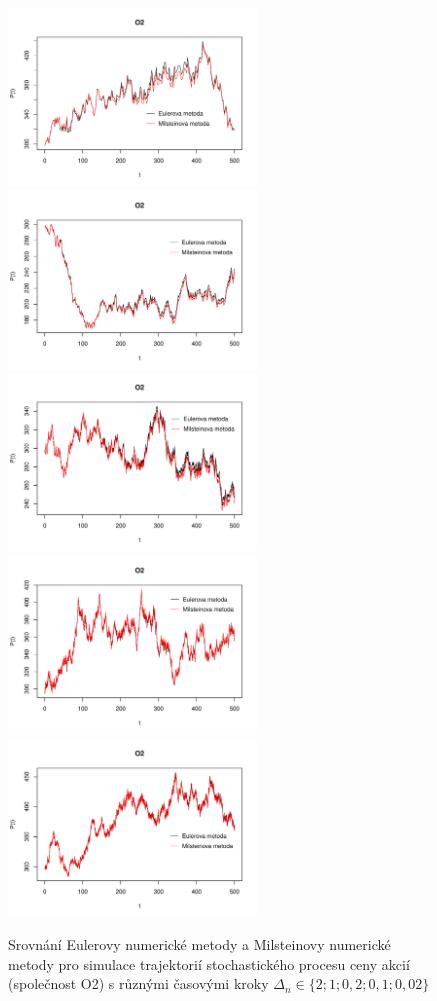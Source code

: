 \documentclass[a4paper,12pt]{report}
\theoremstyle{definition} \newtheorem{definice}[veta]{Definice}
\theoremstyle{remark}
\begin{document}
\begin{figure}[!htbp]
  \centering 
	\includegraphics[width=6.6cm, clip, trim= 0 15 25 50]{IMG/e_m_o2_v3_q0_5.pdf}\quad
	\includegraphics[width=6.6cm, clip, trim= 0 15 25 50]{IMG/e_m_o2_v3_q1.pdf}\\
	\includegraphics[width=6.6cm, clip, trim= 0 15 25 50]{IMG/e_m_o2_v3_q5.pdf}\quad
	\includegraphics[width=6.6cm, clip, trim= 0 15 25 50]{IMG/e_m_o2_v3_q10.pdf}\\
	\includegraphics[width=6.6cm, clip, trim= 0 15 25 50]{IMG/e_m_o2_v3_q50.pdf}
  \caption{Srovnání Eulerovy numerické metody a Milsteinovy numerické metody pro simulace trajektorií stochastického procesu ceny akcií (společnost O2) s různými časovými kroky $\Delta_n\in\{2; 1; 0,2; 0,1; 0,02\}$}  \label{euler_milstein_q}
\end{figure}
\end{document}
